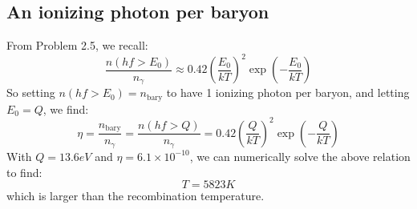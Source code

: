 \subsection{An ionizing photon per baryon}
From Problem 2.5, we recall:
\begin{equation}
    \frac{n(hf > E_0)}{n_\gamma} \approx 0.42\left(\frac{E_0}{kT}\right)^2\exp(-\frac{E_0}{kT})
\end{equation}
So setting $n(hf > E_0) = n_{\text{bary}}$ to have 1 ionizing photon per baryon, and letting $E_0 = Q$, we find:
\begin{equation}
    \eta = \frac{n_{\text{bary}}}{n_{\gamma}} = \frac{n(hf > Q)}{n_\gamma} = 0.42\left(\frac{Q}{kT}\right)^2\exp(-\frac{Q}{kT})
\end{equation}
With $Q = 13.6\si{eV}$ and $\eta = 6.1 \times 10^{-10}$, we can numerically solve the above relation to find:
\begin{equation}
    \boxed{T = 5823\si{K}}
\end{equation}
which is larger than the recombination temperature.

